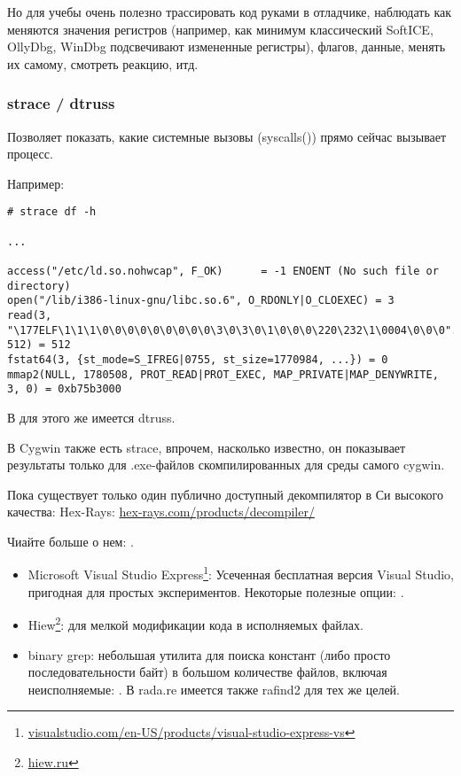 Но для учебы очень полезно трассировать код руками в отладчике, наблюдать как меняются значения регистров 
(например, как минимум классический SoftICE, OllyDbg, WinDbg подсвечивают измененные регистры), 
флагов, данные, менять их самому, смотреть реакцию, итд.


\label{strace}
\subsubsection{strace / dtruss}

Позволяет показать, какие системные вызовы (syscalls()) прямо сейчас вызывает процесс.

Например:

\begin{lstlisting}
# strace df -h

...

access("/etc/ld.so.nohwcap", F_OK)      = -1 ENOENT (No such file or directory)
open("/lib/i386-linux-gnu/libc.so.6", O_RDONLY|O_CLOEXEC) = 3
read(3, "\177ELF\1\1\1\0\0\0\0\0\0\0\0\0\3\0\3\0\1\0\0\0\220\232\1\0004\0\0\0"..., 512) = 512
fstat64(3, {st_mode=S_IFREG|0755, st_size=1770984, ...}) = 0
mmap2(NULL, 1780508, PROT_READ|PROT_EXEC, MAP_PRIVATE|MAP_DENYWRITE, 3, 0) = 0xb75b3000
\end{lstlisting}

\myindex{\MacOSX}
В \MacOSX для этого же имеется dtruss.

В Cygwin также есть strace, впрочем, насколько известно, 
он показывает результаты только для .exe-файлов скомпилированных для среды самого cygwin.


Пока существует только один публично доступный декомпилятор в Си высокого качества: Hex-Rays:
\href{http://go.yurichev.com/17033}{hex-rays.com/products/decompiler/}

Чиайте больше о нем: .



\begin{itemize}
\item
Microsoft Visual Studio Express\footnote{\href{http://go.yurichev.com/17034}{visualstudio.com/en-US/products/visual-studio-express-vs}}:
Усеченная бесплатная версия Visual Studio, пригодная для простых экспериментов.
Некоторые полезные опции: .

\item
\label{Hiew}
Hiew\footnote{\href{http://go.yurichev.com/17035}{hiew.ru}}:
для мелкой модификации кода в исполняемых файлах.
	
\item
{}
binary grep: 
небольшая утилита для поиска констант (либо просто последовательности байт)
в большом количестве файлов, включая неисполняемые: \BGREPURL.
В rada.re имеется также rafind2 для тех же целей.

\end{itemize}

